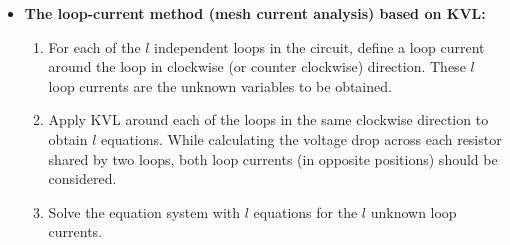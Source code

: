 \documentclass{article}
\begin{document}
\begin{itemize}
\begin{comment}
  \item {\bf Step 5:} We now have three simultaneous equations with three 
    unknown branch currents:
    \begin{equation} 
      \begin{array}{r}
        \sum I_b=0=+I_1+I_2-I_3\;\;\;\;\;\;\;\;\;\;(1)	\\
	\sum V_{abda}=0=V_{ab}+V_{bd}+V_{da}=2I_1+8I_3-32\;\;\;\;\;\;\;\;\;\;(2') \\
	\sum V_{bcdb}=0=V_{cb}+V_{bd}+V_{dc}=4I_2+8I_3-20\;\;\;\;\;\;\;\;\;\;(3')
	\end{array} 
    \end{equation}
    which can be rewritten as
    \begin{equation}
      \left\{ \begin{array}{rrrrr}
	I_1 & +I_2 & -I_3& = &  0\;\;\;\;\;\;\;\;\;\;(1) \\
	2I_1 &    & +8I_3 & = & 32\;\;\;\;\;\;\;\;\;\;(2') \\
	&4I_2& +8I_3 & = & 20\;\;\;\;\;\;\;\;\;\;(3') \end{array} \right. 
    \end{equation}
  \item {\bf Step 6: } Solving the equations, we get the three unknown currents:
    \begin{equation} 
      I_1=4,\;\;\;I_2=-1,\;\;\;I_3=3	
    \end{equation}
    and then we get the three unknown voltages:
    \begin{equation}
      V_{ab}=8,\;\;\;V_{bd}=24,\;\;\;V_{cb}=-4
    \end{equation}
  \end{itemize}

  Note that equations from KCL at node d and KVL to other loops are not
  independent. In general, if a circuit has n nodes and b branches, then
  there are $(n-1)$ independent node equations and $l=b-(n-1)$ independent 
  loop equations. In other words, the sum of the number of independent loops
  and the number of independent nodes is always the same as the number of 
  branches, i.e., the number of equations is always equal to the number of 
  unknowns in the branch current method.
\end{comment}

\item {\bf The loop-current method (mesh current analysis) based on KVL:}
  \begin{enumerate} 
  \item For each of the $l$ independent loops in the circuit, define a 
    loop current around the loop in clockwise (or counter clockwise)
    direction. These $l$ loop currents are the unknown variables to
    be obtained.
  \item Apply KVL around each of the loops in the same clockwise 
    direction to obtain $l$ equations. While calculating the voltage 
    drop across each resistor shared by two loops, both loop currents 
    (in opposite positions) should be considered.
  \item Solve the equation system with $l$ equations for the $l$ unknown
    loop currents.
  \end{enumerate}
  

\end{itemize}
\end{document}
